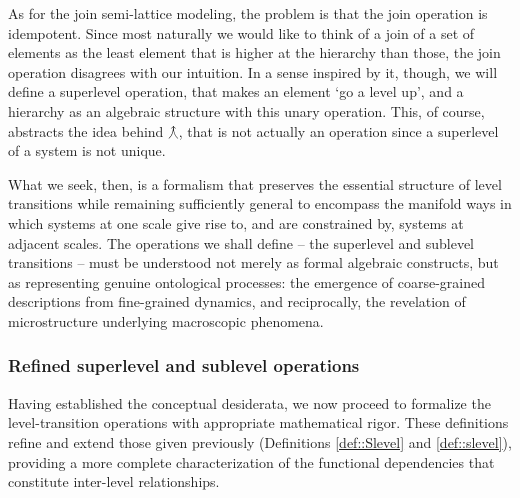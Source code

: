 As for the join semi-lattice modeling, the problem is that the join operation is idempotent. Since most naturally we would like to think of a join of a set of elements as the least element that is higher at the hierarchy than those, the join operation disagrees with our intuition. In a sense inspired by it, though, we will define a superlevel operation, that makes an element `go a level up', and a hierarchy as an algebraic structure with this unary operation. This, of course, abstracts the idea behind $\operatorname*{\curlywedgeuparrow}$, that is not actually an operation since a superlevel of a system is not unique.

What we seek, then, is a formalism that preserves the essential structure of level transitions while remaining sufficiently general to encompass the manifold ways in which systems at one scale give rise to, and are constrained by, systems at adjacent scales. The operations we shall define -- the superlevel and sublevel transitions -- must be understood not merely as formal algebraic constructs, but as representing genuine ontological processes: the emergence of coarse-grained descriptions from fine-grained dynamics, and reciprocally, the revelation of microstructure underlying macroscopic phenomena.

\subsubsection{Refined superlevel and sublevel operations}

Having established the conceptual desiderata, we now proceed to formalize the level-transition operations with appropriate mathematical rigor. These definitions refine and extend those given previously (Definitions \ref{def::Slevel} and \ref{def::slevel}), providing a more complete characterization of the functional dependencies that constitute inter-level relationships.

